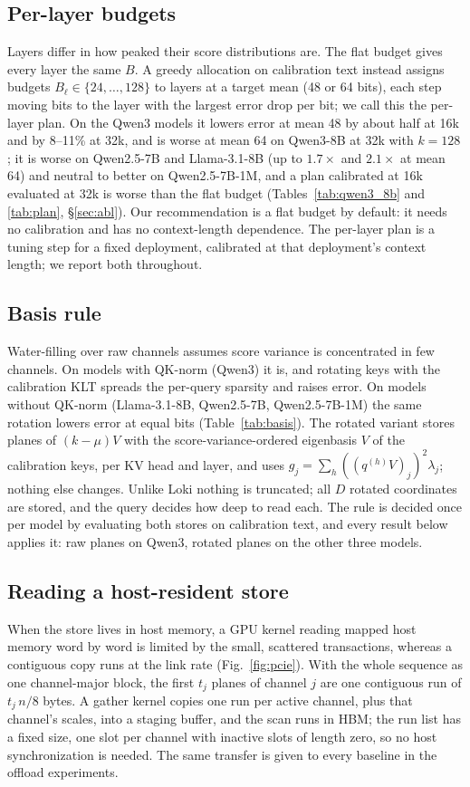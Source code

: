 \documentclass[10pt,twocolumn]{article}
\begin{document}
\subsection{Per-layer budgets}
Layers differ in how peaked their score distributions are. The flat budget gives every layer the same $B$. A greedy allocation on calibration text instead assigns budgets $B_\ell\in\{24,\dots,128\}$ to layers at a target mean (48 or 64 bits), each step moving bits to the layer with the largest error drop per bit; we call this the per-layer plan. On the Qwen3 models it lowers error at mean 48 by about half at 16k and by 8--11\% at 32k, and is worse at mean 64 on Qwen3-8B at 32k with $k=128$; it is worse on Qwen2.5-7B and Llama-3.1-8B (up to $1.7\times$ and $2.1\times$ at mean 64) and neutral to better on Qwen2.5-7B-1M, and a plan calibrated at 16k evaluated at 32k is worse than the flat budget (Tables~\ref{tab:qwen3_8b} and \ref{tab:plan}, \S\ref{sec:abl}). Our recommendation is a flat budget by default: it needs no calibration and has no context-length dependence. The per-layer plan is a tuning step for a fixed deployment, calibrated at that deployment's context length; we report both throughout.

\subsection{Basis rule}\label{sec:basis}
Water-filling over raw channels assumes score variance is concentrated in few channels. On models with QK-norm (Qwen3) it is, and rotating keys with the calibration KLT spreads the per-query sparsity and raises error. On models without QK-norm (Llama-3.1-8B, Qwen2.5-7B, Qwen2.5-7B-1M) the same rotation lowers error at equal bits (Table~\ref{tab:basis}). The rotated variant stores planes of $(k-\mu)V$ with the score-variance-ordered eigenbasis $V$ of the calibration keys, per KV head and layer, and uses $g_j=\sum_h((q^{(h)}V)_j)^2\lambda_j$; nothing else changes. Unlike Loki nothing is truncated; all $D$ rotated coordinates are stored, and the query decides how deep to read each. The rule is decided once per model by evaluating both stores on calibration text, and every result below applies it: raw planes on Qwen3, rotated planes on the other three models.

\subsection{Reading a host-resident store}\label{sec:gather}
When the store lives in host memory, a GPU kernel reading mapped host memory word by word is limited by the small, scattered transactions, whereas a contiguous copy runs at the link rate (Fig.~\ref{fig:pcie}). With the whole sequence as one channel-major block, the first $t_j$ planes of channel $j$ are one contiguous run of $t_j\,n/8$ bytes. A gather kernel copies one run per active channel, plus that channel's scales, into a staging buffer, and the scan runs in HBM; the run list has a fixed size, one slot per channel with inactive slots of length zero, so no host synchronization is needed. The same transfer is given to every baseline in the offload experiments.
\end{document}
